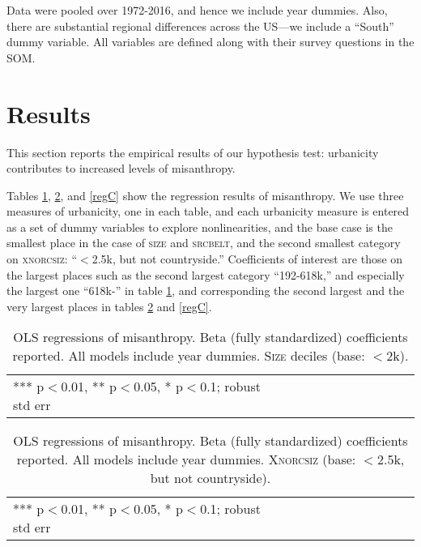 \documentclass[11pt, letterpaper]{article}
\begin{document}
\begin{spacing}{1.4}
Data were pooled over 1972-2016, and hence we include year dummies. Also, there
are substantial regional differences across the US---we include a ``South'' dummy variable. All variables are defined along with their survey questions in the SOM.

\section*{Results}

This section reports the empirical results of our hypothesis test:
 urbanicity contributes to increased levels of misanthropy.

Tables \ref{regA}, \ref{regB}, and \ref{regC} show the regression results of misanthropy. We use three measures of
urbanicity, one in each table,  and each urbanicity measure is entered as a set of dummy variables to
explore nonlinearities, and the base case is the smallest place in the case of
\textsc{size} and \textsc{srcbelt}, and the second smallest category on \textsc{xnorcsiz}:
 ``$<$2.5k, but not countryside.'' Coefficients of interest are those on the
 largest  places such as the second largest category ``192-618k,'' and especially the largest one ``618k-'' in table
\ref{regA}, and corresponding the second largest and the very largest places in tables
\ref{regB} and \ref{regC}.

\begin{table}[h!]\centering
\caption{OLS regressions  of misanthropy. Beta (fully standardized) coefficients
  reported. All models include year dummies. \textsc{Size} deciles (base: $<$2k).} \label{regA}
\begin{scriptsize} \begin{tabular}{p{1.8in}p{.45in}p{.45in}p{.45in}p{.45in}p{.45in}p{.45in}p{.45in}p{.45in}p{.45in}p{.45 in}}\hline

\hline  *** p$<$0.01, ** p$<$0.05, * p$<$0.1; robust std err
\end{tabular}\end{scriptsize}\end{table}

\begin{table}[h!]\centering
\caption{OLS regressions  of misanthropy. Beta (fully standardized) coefficients
  reported. All models include year dummies.  \textsc{Xnorcsiz} (base: $<$2.5k, but not countryside).} \label{regB}
\begin{scriptsize} \begin{tabular}{p{1.8in}p{.45in}p{.45in}p{.45in}p{.45in}p{.45in}p{.45in}p{.45in}p{.45in}p{.45in}p{.45 in}}\hline

\hline  *** p$<$0.01, ** p$<$0.05, * p$<$0.1; robust std err
\end{tabular}\end{scriptsize}\end{table}


\end{spacing}
\end{document}
